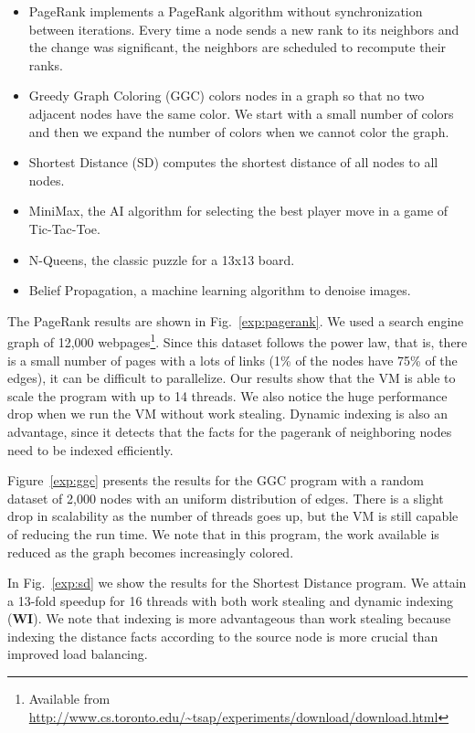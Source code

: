 \documentclass{sigplanconf}
\begin{document}
\begin{itemize}
\item PageRank implements a PageRank algorithm without synchronization
  between iterations. Every time a node sends a new rank to its
  neighbors and the change was significant, the neighbors are
  scheduled to recompute their ranks.
\item Greedy Graph Coloring (GGC) colors nodes in a graph so that no
  two adjacent nodes have the same color. We start with a small number
  of colors and then we expand the number of colors when we cannot
  color the graph.
\item Shortest Distance (SD) computes the shortest distance of all
  nodes to all nodes.
\item MiniMax, the AI algorithm for selecting the best player move in a game of Tic-Tac-Toe.
\item N-Queens, the classic puzzle for a 13x13 board.
\item Belief Propagation, a machine learning algorithm to denoise
  images.
\end{itemize}

The PageRank results are shown in Fig.~\ref{exp:pagerank}. We used a
search engine graph of 12,000 webpages\footnote{Available from
  \url{http://www.cs.toronto.edu/~tsap/experiments/download/download.html}}. Since
this dataset follows the power law, that is, there is a small number
of pages with a lots of links (1\% of the nodes have 75\% of the
edges), it can be difficult to parallelize. Our results show that the
VM is able to scale the program with up to 14 threads.  We also notice
the huge performance drop when we run the VM without work
stealing. Dynamic indexing is also an advantage, since it detects that
the facts for the pagerank of neighboring nodes need to be indexed
efficiently.

Figure~\ref{exp:ggc} presents the results for the GGC program with a
random dataset of 2,000 nodes with an uniform distribution of edges.
There is a slight drop in scalability as the number of threads goes
up, but the VM is still capable of reducing the run time. We note that
in this program, the work available is reduced as the graph becomes
increasingly colored.

In Fig.~\ref{exp:sd} we show the results for the Shortest Distance program.
We attain a 13-fold speedup for 16 threads with both work stealing and dynamic
indexing (\textbf{WI}). We note that indexing is more advantageous than work stealing
because indexing the distance facts according to the source node is more crucial
than improved load balancing.
\end{document}
